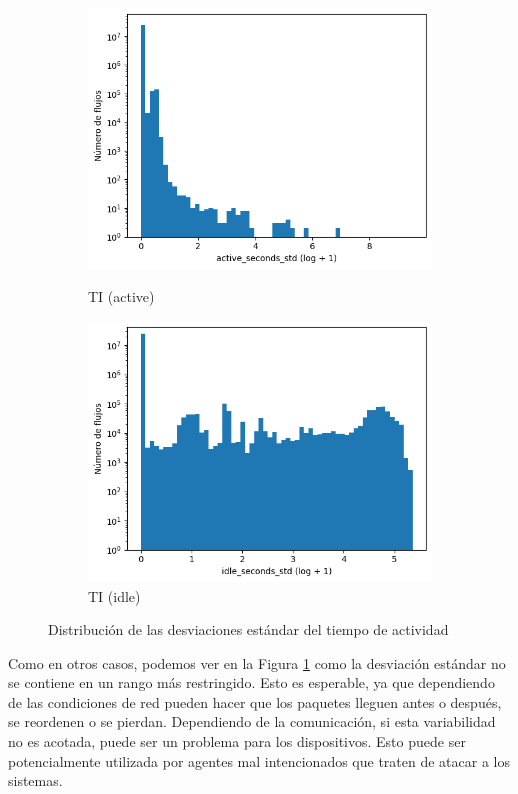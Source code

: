 \begin{figure}[H]
\begin{subfigure}[b]{0.26\textwidth}
        \includegraphics[width=\linewidth]{media/packet_pincer_toniot/active_seconds_std_log_x_log_y.png}
        \caption{TI (active)}
        \includegraphics[width=\linewidth]{media/packet_pincer_toniot/idle_seconds_std_log_x_log_y.png}
        \caption{TI (idle)}
    \end{subfigure}
       \caption{Distribución de las desviaciones estándar del tiempo de actividad}
       \label{fig:packet_pincer_active_seconds_std}
\end{figure}

Como en otros casos, podemos ver en la Figura \ref{fig:packet_pincer_active_seconds_std} como la desviación estándar no se contiene en un rango más restringido. Esto es esperable, ya que dependiendo de las condiciones de red pueden hacer que los paquetes lleguen antes o después, se reordenen o se pierdan. Dependiendo de la comunicación, si esta variabilidad no es acotada, puede ser un problema para los dispositivos. Esto puede ser potencialmente utilizada por agentes mal intencionados que traten de atacar a los sistemas.

